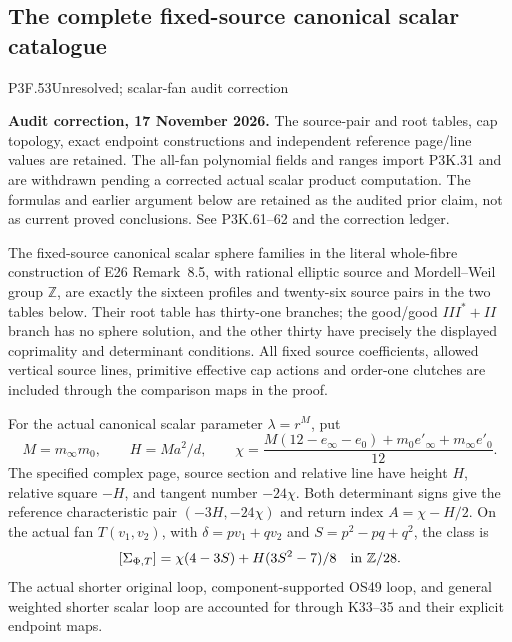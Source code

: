 \subsection{The complete fixed-source canonical scalar catalogue}
\begin{statement}{P3F.53}{Unresolved; scalar-fan audit correction}
\par\noindent\textbf{Audit correction, 17 November 2026.} The source-pair and root tables, cap topology, exact endpoint constructions and independent reference page/line values are retained. The all-fan polynomial fields and ranges import P3K.31 and are withdrawn pending a corrected actual scalar product computation. The formulas and earlier argument below are retained as the audited prior claim, not as current proved conclusions. See P3K.61--62 and the correction ledger.
\medskip


The fixed-source canonical scalar sphere families in the literal
whole-fibre construction of E26 Remark~8.5, with rational elliptic
source and Mordell--Weil group \(\mathbb Z\), are exactly the
sixteen profiles and twenty-six source pairs in the two tables below.
Their root table has thirty-one branches; the good/good
\(III^*+II\) branch has no sphere solution, and the other thirty
have precisely the displayed coprimality and determinant conditions.
All fixed source coefficients, allowed vertical source lines,
primitive effective cap actions and order-one clutches are included
through the comparison maps in the proof.

For the actual canonical scalar parameter \(\lambda=r^M\), put
\[
 M=m_\infty m_0,\qquad H=Ma^2/d,\qquad
 \chi=\frac{M(12-e_\infty-e_0)+m_0e'_\infty+m_\infty e'_0}{12}.
\]
The specified complex page, source section and relative line have
height \(H\), relative square \(-H\), and tangent number
\(-24\chi\). Both determinant signs give the reference characteristic
pair \((-3H,-24\chi)\) and return index \(A=\chi-H/2\).
On the actual fan \(T(v_1,v_2)\), with
\(\delta=pv_1+qv_2\) and \(S=p^2-pq+q^2\), the class is
\[
 [\Sigma_{\Phi,T}]
       =\chi(4-3S)+H(3S^2-7)/8\quad\hbox{in }\mathbb Z/28.
\]
The actual shorter original loop, component-supported OS49 loop,
and general weighted shorter scalar loop are accounted for through
K33--35 and their explicit endpoint maps.
\end{statement}
